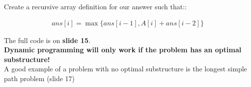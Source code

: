 \documentclass[12pt]{book}
\begin{document}
Create a recursive array definition for our answer such that::

\begin{align*}
    ans[i]=\max\{ans[i-1], A[i]+ans[i-2]\}
\end{align*}

The full code is on \textbf{slide 15}.\\
\textbf{Dynamic programming will only work if the problem has an optimal substructure!}\\

A good example of a problem with no optimal substructure is the longest simple path problem (slide 17)

\end{document}
